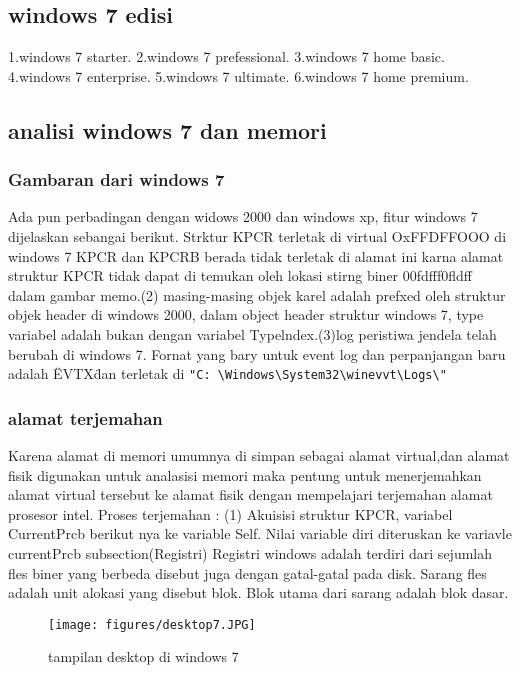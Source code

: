 		\subsection{windows 7 edisi}
			1.windows 7 starter.
			2.windows 7 prefessional.
			3.windows 7 home basic.
			4.windows 7 enterprise.
			5.windows 7 ultimate.
			6.windows 7 home premium.
		\subsection{analisi windows 7 dan memori}
			\subsubsection{Gambaran dari windows 7}
				Ada pun perbadingan dengan widows 2000 dan windows xp, fitur windows 7 
				dijelaskan sebangai berikut. Strktur KPCR terletak di virtual OxFFDFFOOO
				di windows 7 KPCR dan KPCRB berada tidak terletak di alamat ini karna
				alamat struktur KPCR tidak dapat di temukan oleh lokasi stirng biner 
				00fdfff0fldff dalam gambar memo.(2) masing-masing objek karel adalah 
				prefxed oleh struktur objek header di windows 2000, dalam object header
				struktur windows 7, type variabel adalah bukan dengan variabel 
				Typelndex.(3)log peristiwa jendela telah berubah di windows 7. Fornat 
				yang bary untuk event log dan perpanjangan baru adalah \"EVTX\" 
				dan terletak di \verb|"C: \Windows\System32\winevvt\Logs\"|
		\subsubsection{alamat terjemahan}
			Karena alamat di memori umumnya di simpan sebagai alamat virtual,dan 
			alamat fisik digunakan untuk analasisi memori maka pentung untuk 
			menerjemahkan alamat virtual tersebut ke alamat fisik dengan 
			mempelajari terjemahan alamat prosesor intel. Proses terjemahan :  
			(1) Akuisisi struktur KPCR, variabel CurrentPrcb berikut nya ke 
			variable Self. Nilai variable diri diteruskan ke variavle currentPrcb 
			subsection(Registri)
			Registri windows adalah terdiri dari sejumlah fles biner yang berbeda 
			disebut juga dengan gatal-gatal pada disk. Sarang fles adalah unit 
			alokasi yang disebut blok. Blok utama dari sarang adalah blok dasar.

\cite{zhang2010exploratory} 

\begin{figure}[ht]
\centerline{\texttt{[image: figures/desktop7.JPG]}}
\caption{tampilan desktop di windows 7}
\label{desktop7}
\end{figure}

